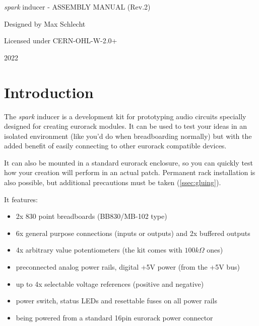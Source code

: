 \documentclass[12pt, a4paper]{article}
\begin{document}
\thispagestyle{empty}
\begin{center}
    \begin{minipage}{0.9\linewidth}
        \centering
        \vspace{4cm}
        {
            \Large
            \textit{spark} inducer \hspace{1mm} - \hspace{1mm} ASSEMBLY MANUAL
            \normalsize (Rev.2)
            \par
        }
        \vspace{1cm}
        \par
        \vspace{2cm}
        {\Large Designed by Max Schlecht\par}
        \vspace{0.5cm}
        {\large Licensed under \ibmplex CERN-OHL-W-2.0+ \par}
        \vspace{6cm}
        { \hfill \large 2022}
    \end{minipage}
\end{center}
\clearpage

\section*{Introduction}

The \textit{spark} inducer is a development kit for prototyping audio circuits specially
designed for creating eurorack modules. It can be used to test your ideas in an isolated
environment (like you'd do when breadboarding normally) but with the added benefit of easily
connecting to other eurorack compatible devices.

It can also be mounted in a standard eurorack enclosure, so you can quickly test how your
creation will perform in an actual patch. Permanent rack installation is also possible, but
additional precautions must be taken (\autoref{ssec:gluing}).

\vspace{2mm}

It features:
\begin{itemize}[topsep=2pt]
    \item 2x 830 point breadboards (BB830/MB-102 type)
    \item 6x general purpose connections (inputs or outputs) and 2x buffered outputs
    \item 4x arbitrary value potentiometers (the kit comes with $100k\Omega$ ones)
    \item preconnected analog power rails, digital +5V power (from the +5V bus)
    \item up to 4x selectable voltage references (positive and negative)
    \item power switch, status LEDs and resettable fuses on all power rails 
    \item being powered from a standard 16pin eurorack power connector
\end{itemize}
\end{document}
